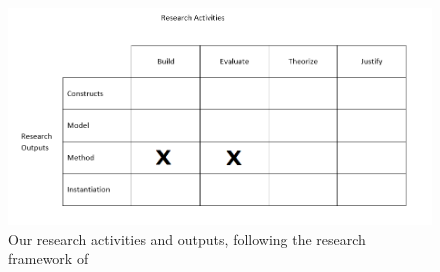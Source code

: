 \begin{figure}
\centering
\includegraphics[width=1\linewidth]{"Figures/design science figur"}
\caption{Our research activities and outputs, following the research framework of \citet{march1995designfigure}}
\label{fig:design-science-figur}
\end{figure}


